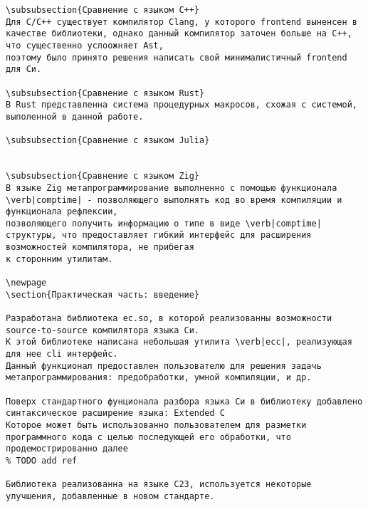 {\begin{verbatim}
\subsubsection{Сравнение с языком C++}
Для C/C++ существует компилятор Clang, у которого frontend выненсен в качестве библиотеки, однако данный компилятор заточен больше на C++, что существенно услоожняет Ast, 
поэтому было принято решения написать свой минималистичный frontend для Си.

\subsubsection{Сравнение с языком Rust}
В Rust представленна система процедурных макросов, схожая с системой, выполенной в данной работе.

\subsubsection{Сравнение с языком Julia}


\subsubsection{Сравнение с языком Zig}
В языке Zig метапрограммирование выполненно с помощью функционала \verb|comptime| - позволяющего выполнять код во время компиляции и функционала рефлексии, 
позволяющего получить информацию о типе в виде \verb|comptime| структуры, что предоставляет гибкий интерфейс для расширения возможностей компилятора, не прибегая 
к сторонним утилитам.

\newpage
\section{Практическая часть: введение}

Разработана библиотека ec.so, в которой реализованны возможности source-to-source компилятора языка Си.
К этой библиотеке написана небольшая утилита \verb|ecc|, реализующая для нее cli интерфейс.
Данный функционал предоставлен пользователю для решения задачь метапрограммирования: предобработки, умной компиляции, и др.

Поверх стандартного фунционала разбора языка Си в библиотеку добавлено синтаксическое расширение языка: Extended C
Которое может быть использованно пользователем для разметки программного кода с целью последующей его обработки, что продемострированно далее 
% TODO add ref

Библиотека реализованна на языке C23, используется некоторые улучшения, добавленные в новом стандарте.


\end{verbatim}}
